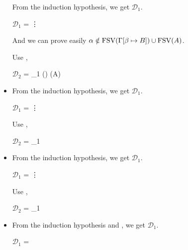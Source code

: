 \begin{itemize}
	      From the induction hypothesis, we get $\mathcal{D}_1$.
	      	      	      	      
	      $\mathcal{D}_1$ = 
	      {\vdots}
	      	      	      	      
	      And we can prove easily $\alpha \notin \text{FSV}(\Gamma[\beta \mapsto B]) \cup \text{FSV}(A)$.
	      	      	      	      
	      Use \TGen,
	      	      	      	      
	      $\mathcal{D}_2$ = 
	      {_1 \andalso \alpha \notin \FTV(\GG) \cup \FTV(A)}
	      	      	      	      
	\item \TIns
	      	      	      	      
	      From the induction hypothesis, we get $\mathcal{D}_1$.
	      	      	      	      
	      $\mathcal{D}_1$ = 
	      {\vdots}
	      	      	      	      
	      Use \TIns,
	      	      	      	      
	      $\mathcal{D}_2$ = 
	      {_1}
	      	      	      	      
	\item \TCsp
	      	      	      	      
	      From the induction hypothesis, we get $\mathcal{D}_1$.
	      	      	      	      
	      $\mathcal{D}_1$ = 
	      {\vdots}
	      	      	      	      
	      Use \TCsp,
	      	      	      	      
	      $\mathcal{D}_2$ = 
	      {_1}
	      	      	      	      
	\item \QKAbs
	      	      	      	      
	      From the induction hypothesis and \QKAbs, we get $\mathcal{D}_1$.
	      	      	      	      
	      $\mathcal{D}_1$ = 
	      { \andalso
	      	 }
	      	      	      	      

\end{itemize}
